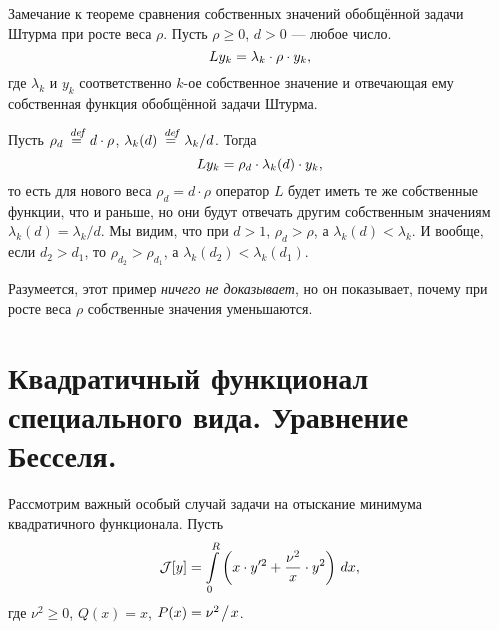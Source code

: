 \documentclass[12pt,a4paper,openany,fleqn]{book}
\newcommand {\defeq}{\stackrel{\hspace{0.09 cm}de\!f}{=}}
\newcommand {\eqdef}{\defeq}
\newcommand{\J}{\ensuremath{\mathcal{J}}}
\theoremstyle{definition}
\begin{document}
	Замечание к теореме сравнения собственных значений обобщённой задачи Штурма при росте веса $\rho$. Пусть $\rho\geqslant0$, $d>0$ --- любое число.
	\begin{equation*}
		\hfill Ly_k=\lambda_k\cdot\rho\cdot y_k,\hfill
	\end{equation*}
	где $\lambda_k$ и $y_k$ соответственно $k$-ое собственное значение и отвечающая ему собственная функция обобщённой задачи Штурма. 
	
	Пусть $\rho_d\eqdef d\cdot\rho$, $\lambda_k(d)\eqdef\lambda_k/d$. Тогда 
	\begin{equation*}
		\hfill Ly_k=\rho_d\cdot\lambda_k(d)\cdot y_k,\hfill
	\end{equation*}
	то есть для нового веса $\rho_d=d\cdot\rho$ оператор $L$ будет иметь те же собственные функции, что и раньше, но они будут отвечать другим собственным значениям $\lambda_k(d)=\lambda_k/d$. Мы видим, что при $d>1$, $\rho_d>\rho$, а $\lambda_k(d)<\lambda_k$. И вообще, если $d_2>d_1$, то $\rho_{d_2}>\rho_{d_1}$, а $\lambda_k(d_2)<\lambda_k(d_1)$.
	
	Разумеется, этот пример \emph{ничего не доказывает}, но он показывает, почему при росте веса $\rho$ собственные значения уменьшаются.
	
	\section[Функционал Бесселя. Уравнение Бесселя.]{Квадратичный функционал специального вида. Уравнение Бесселя.}	
	\label{lecture8section2}
	
	Рассмотрим важный особый случай задачи на отыскание минимума квадратичного функционала. Пусть
	\begin{equation*}
		\hfill\J[y]=\int\limits_0^R\left(x\cdot y^{\prime2}+\frac{\nu^2}{x}\cdot y^2\right)\,dx,\hfill
	\end{equation*}
	где $\nu^2\geqslant0$, $Q(x)=x$, $P(x)=\nu^2\!\bigm/\!x$.
	
\end{document}
